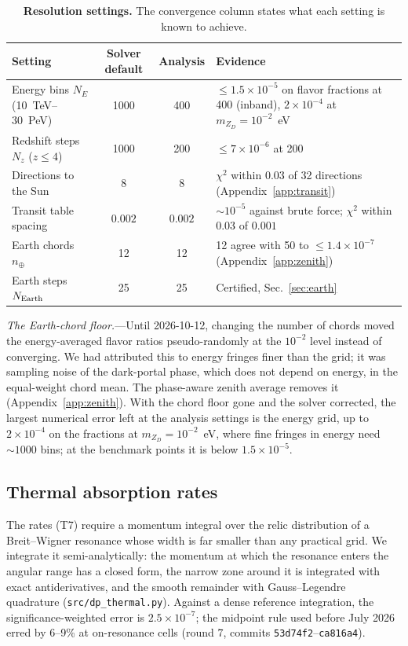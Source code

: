 \documentclass[11pt,a4paper]{article}
\newcommand{\file}[1]{\nolinkurl{#1}}
\newcommand{\mzd}{m_{Z_D}}
\begin{document}
\begin{table}[h]
\centering
\caption{\textbf{Resolution settings.} The convergence column states what each setting is known
to achieve.}
\label{tab:resolution}
\small
\begin{tabular}{lccp{5.2cm}}
\toprule
Setting & Solver default & Analysis & Evidence \\
\midrule
Energy bins $N_E$ (10~TeV--30~PeV) & 1000 & 400 & $\le1.5\times10^{-5}$ on flavor fractions at 400 (inband), $2\times10^{-4}$ at $\mzd = 10^{-2}$~eV \\
Redshift steps $N_z$ ($z \le 4$) & 1000 & 200 & $\le7\times10^{-6}$ at 200 \\
Directions to the Sun & 8 & 8 & $\chi^2$ within $0.03$ of 32 directions (Appendix~\ref{app:transit}) \\
Transit table spacing & $0.002$ & $0.002$ & $\sim10^{-5}$ against brute force; $\chi^2$ within $0.03$ of $0.001$ \\
Earth chords $n_\oplus$ & 12 & 12 & 12 agree with 50 to $\le1.4\times10^{-7}$ (Appendix~\ref{app:zenith}) \\
Earth steps $N_{\rm Earth}$ & 25 & 25 & Certified, Sec.~\ref{sec:earth} \\
\bottomrule
\end{tabular}
\end{table}

\textit{The Earth-chord floor.}---Until 2026-10-12, changing the number of chords moved the
energy-averaged flavor ratios pseudo-randomly at the $10^{-2}$ level instead of converging. We
had attributed this to energy fringes finer than the grid; it was sampling noise of the
dark-portal phase, which does not depend on energy, in the equal-weight chord mean. The
phase-aware zenith average removes it (Appendix~\ref{app:zenith}). With the chord floor gone
and the solver corrected, the largest numerical error left at the analysis settings is the
energy grid, up to $2\times10^{-4}$ on the fractions at $\mzd = 10^{-2}$~eV, where fine fringes
in energy need $\sim1000$ bins; at the benchmark points it is below $1.5\times10^{-5}$.

\subsection{Thermal absorption rates}
\label{sec:thermal}

The rates (T7) require a momentum integral over the relic distribution of a Breit--Wigner
resonance whose width is far smaller than any practical grid. We integrate it
semi-analytically: the momentum at which the resonance enters the angular range has a closed
form, the narrow zone around it is integrated with exact antiderivatives, and the smooth
remainder with Gauss--Legendre quadrature (\file{src/dp_thermal.py}). Against a dense
reference integration, the significance-weighted error is $2.5\times10^{-7}$; the midpoint
rule used before July 2026 erred by 6--9\% at on-resonance cells (round 7, commits
\texttt{53d74f2}--\texttt{ca816a4}).
\end{document}
